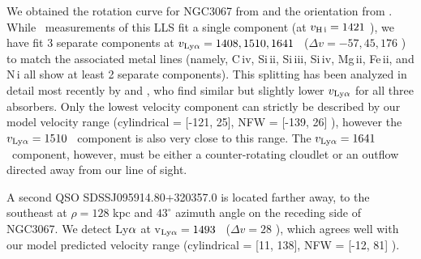 We obtained the rotation curve for NGC3067 from \cite{rubin1982} and the orientation from \cite{carilli1989}. While \HI~measurements of this LLS fit a single component (at $v_{\rm H\,{\sc i}} =1421$ \kms), we have fit 3 separate components at $v_{\rm Ly\alpha} = 1408, 1510, 1641$ \kms~($\Delta v = -57, 45, 176$ \kms) to match the associated metal lines (namely, C\,{\sc iv}, Si\,{\sc ii}, Si\,{\sc iii}, Si\,{\sc iv}, Mg\,{\sc ii}, Fe\,{\sc ii}, and N\,{\sc i} all show at least 2 separate components). This splitting has been analyzed in detail most recently by \cite{keeney2005} and \cite{stocke2010}, who find similar but slightly lower $v_{\rm Ly\alpha}$ for all three absorbers. Only the lowest velocity component can strictly be described by our model velocity range (cylindrical = [-121, 25], NFW = [-139, 26] \kms), however the $v_{\rm Ly\alpha} = 1510$ \kms~component is also very close to this range. The $v_{\rm Ly\alpha} = 1641$ \kms~component, however, must be either a counter-rotating cloudlet or an outflow directed away from our line of sight.

A second QSO SDSSJ095914.80+320357.0 is located farther away, to the southeast at $\rho = 128$ kpc and $43^{\circ}$ azimuth angle on the receding side of NGC3067. We detect Ly$\rm \alpha$ at v$_{\rm Ly\alpha} = 1493$ \kms~($\Delta v = 28$ \kms), which agrees well with our model predicted velocity range (cylindrical = [11, 138], NFW = [-12, 81] \kms).








